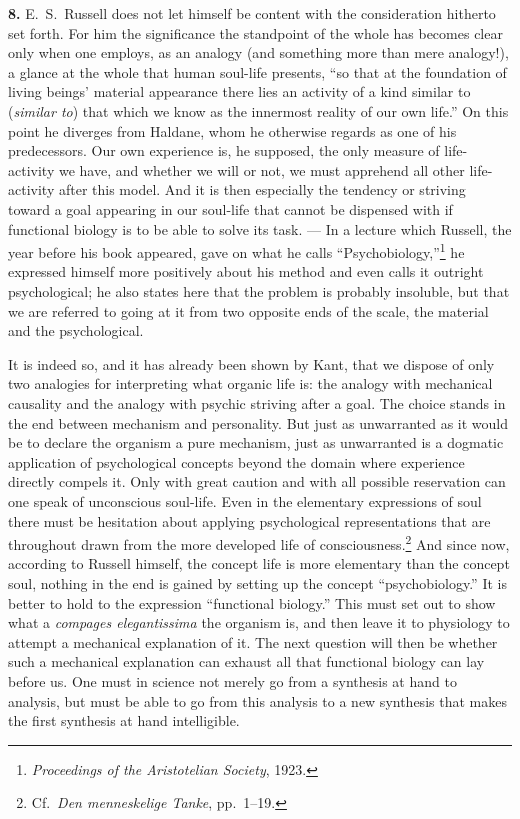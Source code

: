 \documentclass[12pt]{book}
\newcommand{\hnum}[1]{\textbf{#1.}\enspace}
\newcommand{\opage}[1]{\marginnote{\footnotesize\textit{[#1]}}}
\begin{document}
\hnum{8} E.\ S.\ Russell does not let himself be content with the consideration hitherto set forth.
For him the significance the standpoint of the whole has becomes clear only when one employs, as an
analogy (and something more than mere analogy!), a glance at the whole that human soul-life presents,
``so that at the foundation of living beings' material appearance there lies an activity of a kind
similar to (\textit{similar to}) that which we know as the innermost \opage{28}reality of our own life.'' On
this point he diverges from Haldane, whom he otherwise regards as one of his predecessors. Our own
experience is, he supposed, the only measure of life-activity we have, and whether we will or not,
we must apprehend all other life-activity after this model. And it is then especially the tendency
or striving toward a goal appearing in our soul-life that cannot be dispensed with if functional
biology is to be able to solve its task. --- In a lecture which Russell, the year before his book
appeared, gave on what he calls ``Psychobiology,''\footnote{\textit{Proceedings of the Aristotelian
Society}, 1923.} he expressed himself more positively about his method and even calls it outright
psychological; he also states here that the problem is probably insoluble, but that we are referred
to going at it from two opposite ends of the scale, the material and the psychological.

It is indeed so, and it has already been shown by Kant, that we dispose of only two analogies for
interpreting what organic life is: the analogy with mechanical causality and the analogy with
psychic striving after a goal. The choice stands in the end between mechanism and personality. But
just as unwarranted as it would be to declare the organism a pure mechanism, just as unwarranted is
a dogmatic application of psychological concepts beyond the domain where experience directly compels
it. Only with great caution and with all possible reservation can one speak of unconscious
soul-life. Even in the elementary expressions of soul there must be hesitation about applying
psychological representations that are throughout drawn from the more developed life of
consciousness.\footnote{Cf.\ \textit{Den menneskelige Tanke}, pp.\ 1--19.} And since now, according
to Russell himself, the concept life is more elementary than the concept soul, \opage{29}nothing in the end is
gained by setting up the concept ``psychobiology.'' It is better to hold to the expression
``functional biology.'' This must set out to show what a \textit{compages elegantissima} the organism
is, and then leave it to physiology to attempt a mechanical explanation of it. The next question will
then be whether such a mechanical explanation can exhaust all that functional biology can lay before
us. One must in science not merely go from a synthesis at hand to analysis, but must be able to go
from this analysis to a new synthesis that makes the first synthesis at hand intelligible.
\end{document}
